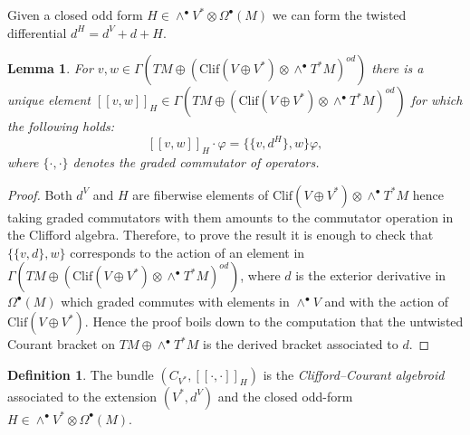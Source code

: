 \documentclass[12pt,twoside]{article}
\theoremstyle{plain}
\newtheorem{lemma}[theorem]{Lemma}%
\theoremstyle{definition}
\newtheorem{definition}[theorem]{Definition}
\newcommand{\Clif}{\mathrm{Clif}}
\newcommand{\gf}{\text{$\varphi$}}
\newcommand{\tensor}{\otimes}
\newcommand{\Cour}[1]{[\![#1]\!]}
\numberwithin{equation}{section}
\begin{document}
Given a closed odd form $H \in \wedge^\bullet V^*\tensor \Omega^\bullet(M)$ we can form the twisted differential $d^H = d^V +d + H$.

\begin{lemma}
For $v,w\in \Gamma(TM \oplus (\Clif(V\oplus V^*)\tensor \wedge^\bullet T^*M)^{od})$ there is a unique element $\Cour{v,w}_H \in \Gamma(TM \oplus (\Clif(V\oplus V^*)\tensor \wedge^\bullet T^*M)^{od})$ for which the following holds:
\[\Cour{v,w}_H \cdot \gf = \{\{v,d^H\},w\} \gf,\]
where $\{\cdot,\cdot\}$ denotes the graded commutator of operators.
\end{lemma}
\begin{proof}
Both $d^V$ and $H$ are  fiberwise elements of $\Clif(V\oplus V^*)\tensor \wedge^\bullet T^*M$ hence taking graded commutators with them amounts to the commutator operation in the Clifford algebra. Therefore, to prove the result it is enough to check that  $\{\{v,d\},w\}$ corresponds to the action of an element in  $\Gamma(TM \oplus (\Clif(V\oplus V^*)\tensor \wedge^\bullet T^*M)^{od})$, where $d$ is the exterior derivative in $\Omega^\bullet(M)$ which graded commutes with elements in $\wedge^\bullet V$ and with the action of  $\Clif(V\oplus V^*)$. Hence the proof boils down to the computation that the untwisted Courant bracket on $TM \oplus \wedge^\bullet T^*M$ is the derived bracket associated to $d$.
\end{proof}



\begin{definition}
The bundle $(C_{V^*}, \Cour{\cdot,\cdot}_H)$ is the \emph{Clifford--Courant algebroid} associated to the extension $(V^*,d^V)$ and the closed odd-form $H \in \wedge^\bullet V^*\tensor \Omega^\bullet(M)$.
\end{definition}
\end{document}
